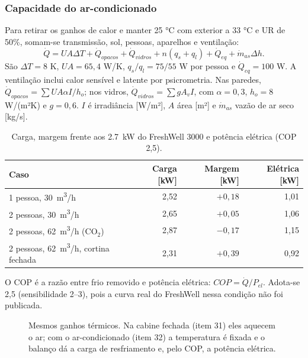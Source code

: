 \documentclass[12pt,a4paper]{article}
\newcommand{\itemsec}[2]{\FloatBarrier\Needspace{5\baselineskip}\subsubsection{#2}\label{item:#1}}
\begin{document}
\itemsec{32}{Capacidade do ar-condicionado}
Para retirar os ganhos de calor e manter 25 °C com exterior a 33 °C e UR de 50\%, somam-se transmissão, sol,
pessoas, aparelhos e ventilação:
\[
 \dot Q=UA\Delta T+\dot Q_{opacos}+\dot Q_{vidros}
 +n(q_s+q_l)+\dot Q_{eq}+\dot m_{as}\Delta h.
\]
São $\Delta T=8$ K, $UA=65{,}4$ W/K, $q_s/q_l=75/55$ W por pessoa e
$\dot Q_{eq}=100$ W. A ventilação inclui calor sensível e latente por psicrometria.
Nas paredes, $\dot Q_{opacos}=\sum UA\alpha I/h_o$; nos vidros,
$\dot Q_{vidros}=\sum gA_vI$, com $\alpha=0{,}3$, $h_o=8$ W/(m²K) e $g=0{,}6$.
$I$ é irradiância [W/m²], $A$ área [m²] e $\dot m_{as}$ vazão de ar seco [kg/s].
\begin{table}[htbp]
\centering\small
\caption{Carga, margem frente aos \SI{2,7}{kW} do FreshWell 3000 e potência elétrica (COP 2,5).}
\label{tab:i32margem}
\begin{tabular}{lrrr}
\toprule
Caso & Carga [kW] & Margem [kW] & Elétrica [kW] \\
\midrule
1 pessoa, \SI{30}{m^3/h} & 2,52 & $+0,18$ & 1,01 \\
2 pessoas, \SI{30}{m^3/h} & 2,65 & $+0,05$ & 1,06 \\
2 pessoas, \SI{62}{m^3/h} (CO$_2$) & 2,87 & $-0,17$ & 1,15 \\
2 pessoas, \SI{62}{m^3/h}, cortina fechada & 2,31 & $+0,39$ & 0,92 \\
\bottomrule
\end{tabular}
\end{table}

O COP é a razão entre frio removido e potência elétrica: $COP=\dot Q/P_{el}$.
Adota-se 2,5 (sensibilidade 2--3), pois a curva real do FreshWell nessa condição não foi publicada.
\begin{figure}[H]
\centering
{}
\caption{Mesmos ganhos térmicos. Na cabine fechada (item 31) eles aquecem o ar; com o
ar-condicionado (item 32) a temperatura é fixada e o balanço dá a carga de resfriamento e, pelo COP, a
potência elétrica.}
\label{fig:fluxo_cabine}
\end{figure}
\end{document}
